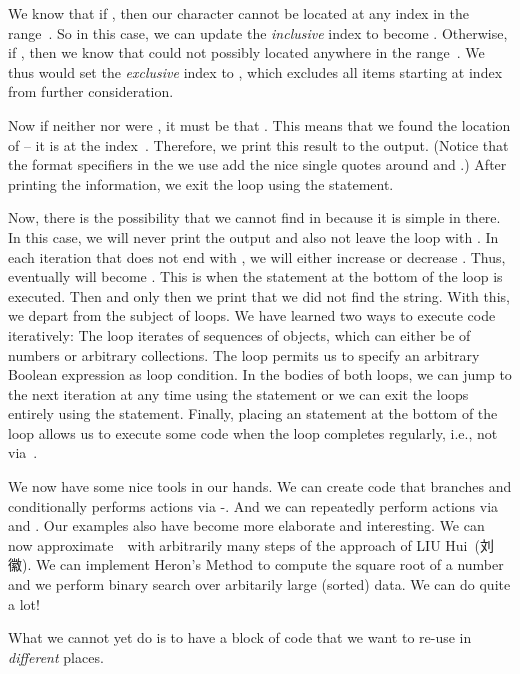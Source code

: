 We know that if , then our character  cannot be located at any index in the range~.
So in this case, we can update the \emph{inclusive} index  to become .
Otherwise, if , then we know that  could not possibly located anywhere in the range~.
We thus would set the \emph{exclusive} index  to , which excludes all items starting at index  from further consideration.%
%
\begin{sloppypar}%
Now if neither  nor  were , it must be that .
This means that we found the location of  -- it is at the index~.
Therefore, we print this result to the output.
(Notice that the  format specifiers in the  we use add the nice single quotes around  and .)
After printing the information, we exit the  loop using the  statement.%
\end{sloppypar}%
%
Now, there is the possibility that we cannot find  in  because it is simple in there.
In this case, we will never print the output and also not leave the loop with .
In each iteration that does not end with , we will either increase  or decrease .
Thus, eventually  will become .
This is when the  statement at the bottom of the loop is executed.
Then and only then we print that we did not find the string.%
\endhsection%
%
%
With this, we depart from the subject of loops.
We have learned two ways to execute code iteratively:
The  loop iterates of sequences of objects, which can either be  of numbers or arbitrary collections.
The  loop permits us to specify an arbitrary Boolean expression as loop condition.
In the bodies of both loops, we can jump to the next iteration at any time using the  statement or we can exit the loops entirely using the  statement.
Finally, placing an  statement at the bottom of the loop allows us to execute some code when the loop completes regularly, i.e., not via~.

We now have some nice tools in our hands.
We can create code that branches and conditionally performs actions via -.
And we can repeatedly perform actions via  and .
Our examples also have become more elaborate and interesting.
We can now approximate~\numberPi\ with arbitrarily many steps of the approach of LIU Hui~(刘徽).
We can implement Heron's Method to compute the square root of a number and we perform binary search over arbitarily large (sorted) data.
We can do quite a lot!

What we cannot yet do is to have a block of code that we want to re-use in \emph{different} places.%
\endhsection%
%
\FloatBarrier%
\endhsection%
%

